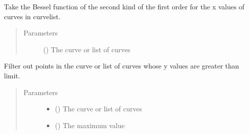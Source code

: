 \documentclass[letterpaper,10pt,english]{sphinxmanual}
\begin{document}
\begin{fulllineitems}
\label{\detokenize{pydv:pydvpy.y1x}}
Take the Bessel function of the second kind of the first order for the x values of
curves in curvelist.
\begin{quote}\begin{description}
\item[{Parameters}] \leavevmode
{} () \textendash{} The curve or list of curves

\end{description}\end{quote}

\end{fulllineitems}


\begin{fulllineitems}
\label{\detokenize{pydv:pydvpy.ymax}}
Filter out points in the curve or list of curves whose y values are greater than limit.
\begin{quote}\begin{description}
\item[{Parameters}] \leavevmode\begin{itemize}
\item {} 
 () \textendash{} The curve or list of curves

\item {} 
 () \textendash{} The maximum value

\end{itemize}

\end{description}\end{quote}

\end{fulllineitems}
\end{document}
